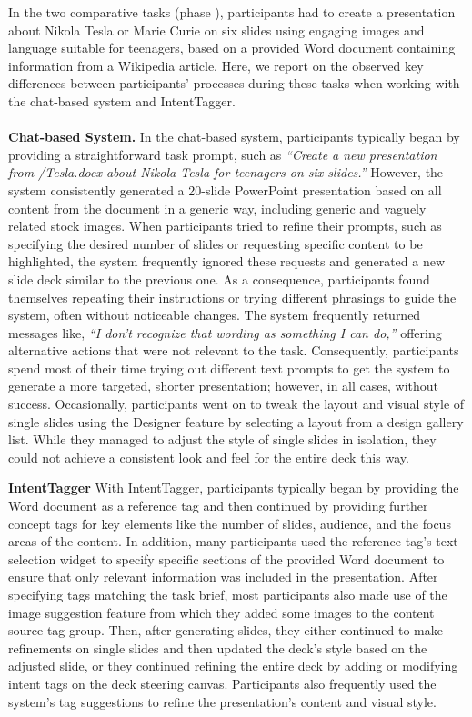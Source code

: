 In the two comparative tasks (phase ), participants had to create a presentation about Nikola Tesla or Marie Curie on six slides using engaging images and language suitable for teenagers, based on a provided Word document containing information from a Wikipedia article.
Here, we report on the observed key differences between participants' processes during these tasks when working with the chat-based system and IntentTagger. 
\\ \\ 
\textbf{Chat-based System.} In the chat-based system, participants typically began by providing a straightforward task prompt, such as \textit{“Create a new presentation from /Tesla.docx about Nikola Tesla for teenagers on six slides.”} However, the system consistently generated a 20-slide PowerPoint presentation based on all content from the document in a generic way, including generic and vaguely related stock images. When participants tried to refine their prompts, such as specifying the desired number of slides or requesting specific content to be highlighted, the system frequently ignored these requests and generated a new slide deck similar to the previous one. 
As a consequence, participants found themselves repeating their instructions or trying different phrasings to guide the system, often without noticeable changes. The system frequently returned messages like, \textit{“I don't recognize that wording as something I can do,”} offering alternative actions that were not relevant to the task. Consequently, participants spend most of their time trying out different text prompts to get the system to generate a more targeted, shorter presentation; however, in all cases, without success. Occasionally, participants went on to tweak the layout and visual style of single slides using the Designer feature by selecting a layout from a design gallery list. While they managed to adjust the style of single slides in isolation, they could not achieve a consistent look and feel for the entire deck this way.



\textbf{IntentTagger}
With IntentTagger, participants typically began by providing the Word document as a reference tag and then continued by providing further concept tags for key elements like the number of slides, audience, and the focus areas of the content.
In addition, many participants used the reference tag's text selection widget to specify specific sections of the provided Word document to ensure that only relevant information was included in the presentation. After specifying tags matching the task brief, most participants also made use of the image suggestion feature from which they added some images to the content source tag group. Then, after generating slides, they either continued to make refinements on single slides and then updated the deck's style based on the adjusted slide, or they continued refining the entire deck by adding or modifying intent tags on the deck steering canvas. Participants also frequently used the system’s tag suggestions to refine the presentation's content and visual style.

